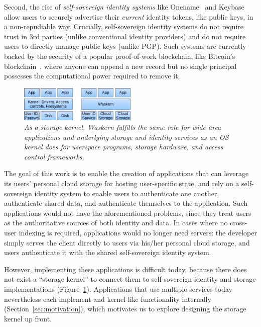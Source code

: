Second, the rise of \textit{self-sovereign identity systems} like
Onename~\cite{onename} and Keybase~\cite{keybase} allow users to
securely advertise their \textit{current} identity tokens, like public keys, in a
non-repudiable way.  Crucially, self-sovereign identity systems do not
require trust in 3rd parties (unlike conventional identity providers)
and do not require users to directly manage public keys (unlike PGP).
Such systems are currently backed by the security of a popular proof-of-work blockchain, like
Bitcoin's blockchain~\cite{bitcoin}, where anyone can append a new record
but no single principal possesses the computational power required to remove it.

\begin{figure}[h!]
\centering
\includegraphics[width=0.5\textwidth]{figures/kernel}
\caption{\it As a storage kernel, Waskern fulfills the same role for wide-area
applications and underlying storage and identity services as an OS kernel does
   for userspace programs, storage hardware, and access control frameworks.}
\label{fig:kernel}
\end{figure}

The goal of this work is to enable the creation of applications that can
leverage its users' personal cloud storage for hosting user-specific state, and
rely on a self-sovereign identity system to enable users to authenticate one
another, authenticate shared data, and authenticate themselves to the application.
Such applications would not have the aforementioned problems, since they
treat users as the authoritative sources of both identity and data.  In cases
where no cross-user indexing is required, applications would no longer need
servers:  the developer simply serves the client directly to users via his/her
personal cloud storage, and users authenticate it with the shared self-sovereign
identity system.

However, implementing these applications is difficult today,
because there does not exist a ``storage kernel'' to connect them to
self-sovereign identity and storage implementations (Figure~\ref{fig:kernel}).
Applications that use multiple services today nevertheless each implement and
kernel-like functionality internally (Section~\ref{sec:motivation}), which motivates us to
explore designing the storage kernel up front.

